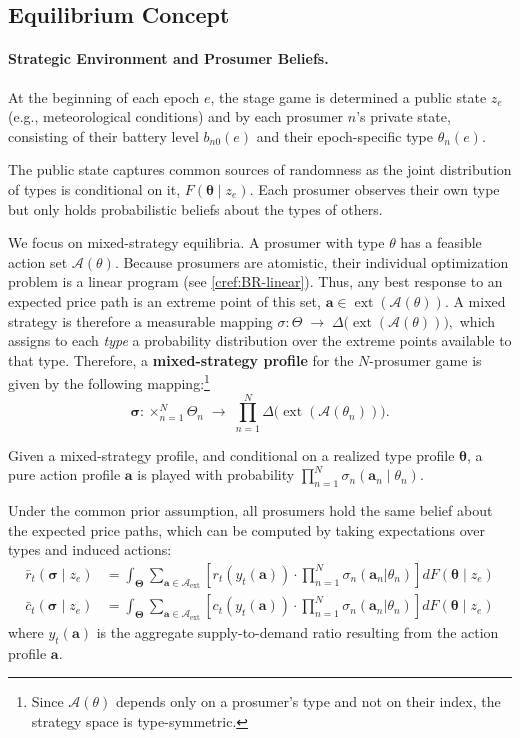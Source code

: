 \documentclass[12pt, notitlepage]{article}
\begin{document}
\subsection{Equilibrium Concept}
\label{sec:welfare}

\paragraph{Strategic Environment and Prosumer Beliefs.}
At the beginning of each epoch $e$, the stage game is determined a public state $z_e$ (e.g., meteorological conditions) and by each prosumer $n$'s private state, consisting of their battery level $b_{n0}(e)$ and their epoch-specific type $\theta_n(e)$. 

The public state captures common sources of randomness as the joint distribution of types is conditional on it, $F(\boldsymbol{\theta} \mid z_e)$. Each prosumer observes their own type but only holds probabilistic beliefs about the types of others.


We focus on mixed-strategy equilibria. A prosumer with type $\theta$ has a feasible action set $\mathcal{A}(\theta)$. Because prosumers are atomistic, their individual optimization problem is a linear program (see \cref{cref:BR-linear}). Thus, any best response to an expected price path is an extreme point of this set, $\boldsymbol{a} \in \operatorname{ext}(\mathcal{A}(\theta))$. A mixed strategy is therefore a measurable mapping $\sigma : \Theta \;\to\; \varDelta\big(\operatorname{ext}(\mathcal{A}(\theta))\big),
$
which assigns to each \textit{type} a probability distribution over the extreme points available to that type. Therefore,  a \textbf{mixed-strategy profile} for the $N$-prosumer game is given by the following mapping:\footnote{Since $\mathcal{A}(\theta)$ depends only on a prosumer's type and not on their index, the strategy space is type-symmetric.}
\[
\boldsymbol{\sigma} : \times_{n=1}^N \Theta_n 
\;\to\; 
\prod_{n=1}^N \varDelta\big(\operatorname{ext}(\mathcal{A}(\theta_n))\big).
\]

 Given a mixed-strategy profile, and conditional on a realized type profile $\boldsymbol{\theta}$, a pure action profile $\mathbf{a}$ is played with probability $\prod_{n=1}^N \sigma_n(\mathbf{a}_n \mid \theta_n).$ 
 
 Under the common prior assumption, all prosumers hold the same belief about the expected price paths, which can be computed by taking expectations over types and induced actions:
\begin{align}
    \bar{r}_t(\boldsymbol{\sigma} \mid z_e) &= \int_{\boldsymbol{\Theta}} \sum_{\mathbf{a} \in \mathcal{A}_{\text{ext}}} \left[ r_t(y_t(\mathbf{a})) \cdot \prod_{n=1}^N \sigma_n(\mathbf{a}_n | \theta_n) \right] dF(\boldsymbol{\theta} \mid z_e) \label{eq:prices-r}\\
    \bar{c}_t(\boldsymbol{\sigma} \mid z_e) &= \int_{\boldsymbol{\Theta}} \sum_{\mathbf{a} \in \mathcal{A}_{\text{ext}}} \left[ c_t(y_t(\mathbf{a})) \cdot \prod_{n=1}^N \sigma_n(\mathbf{a}_n | \theta_n) \right] dF(\boldsymbol{\theta} \mid z_e) \label{eq:prices-c}    
\end{align}
where $y_t(\mathbf{a})$ is the aggregate supply-to-demand ratio resulting from the action profile $\mathbf{a}$.
\end{document}
